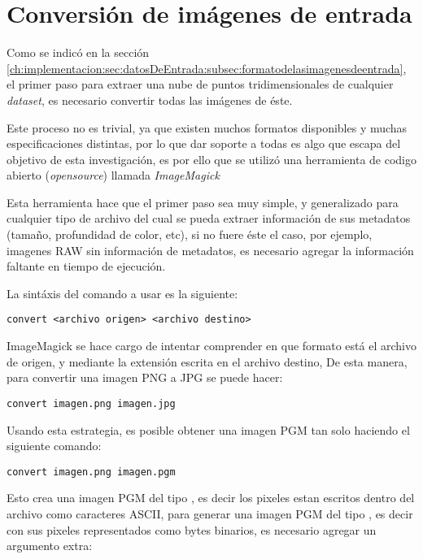 \section{Conversión de imágenes de entrada}
\label{ch:implementacion:sec:conversiondeimagenesdeentrada}

Como se indicó en la sección \ref{ch:implementacion:sec:datosDeEntrada:subsec:formatodelasimagenesdeentrada}, el primer paso para extraer una nube de puntos tridimensionales de cualquier \emph{dataset}, es necesario convertir todas las imágenes de éste.

Este proceso no es trivial, ya que existen muchos formatos disponibles y muchas especificaciones distintas, por lo que dar soporte a todas es algo que escapa del objetivo de esta investigación, es por ello que se utilizó una herramienta de codigo abierto (\emph{opensource}) llamada \emph{ImageMagick}

Esta herramienta hace que el primer paso sea muy simple, y generalizado para cualquier tipo de archivo del cual se pueda extraer información de sus metadatos (tamaño, profundidad de color, etc), si no fuere éste el caso, por ejemplo, imagenes RAW sin información de metadatos, es necesario agregar la información faltante en tiempo de ejecución.

La sintáxis del comando a usar es la siguiente:

\begin{verbatim}
convert <archivo origen> <archivo destino>
\end{verbatim}

ImageMagick se hace cargo de intentar comprender en que formato está el archivo de origen, y mediante la extensión escrita en el archivo destino, De esta manera, para convertir una imagen PNG a JPG se puede hacer:

\begin{verbatim}
convert imagen.png imagen.jpg
\end{verbatim}

Usando esta estrategia, es posible obtener una imagen PGM tan solo haciendo el siguiente comando:

\begin{verbatim}
convert imagen.png imagen.pgm
\end{verbatim}

Esto crea una imagen PGM del tipo , es decir los pixeles estan escritos dentro del archivo como caracteres ASCII, para generar una imagen PGM del tipo , es decir con sus pixeles representados como bytes binarios, es necesario agregar un argumento extra:

